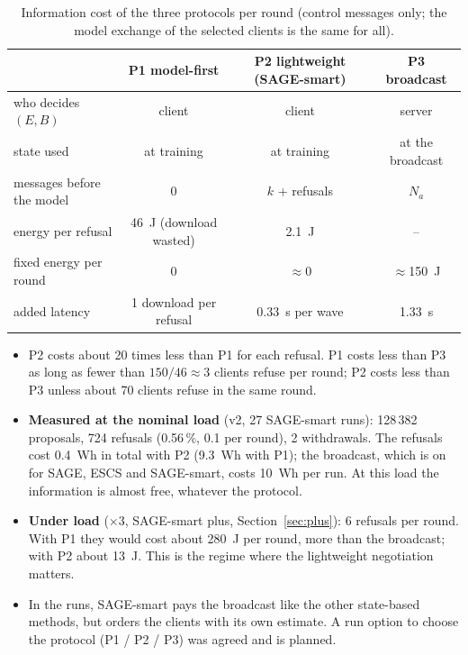 \documentclass[11pt,a4paper]{article}
\begin{document}
\begin{table}[H]
\centering
\small
\caption{Information cost of the three protocols per round (control messages
only; the model exchange of the selected clients is the same for all).}
\label{tab:protocols}
\begin{tabular}{lccc}
\toprule
& P1 model-first & P2 lightweight (SAGE-smart) & P3 broadcast \\
\midrule
who decides $(E,B)$       & client          & client              & server \\
state used                & at training     & at training         & at the broadcast \\
messages before the model & 0               & $k$ + refusals      & $N_a$ \\
energy per refusal        & 46~J (download wasted) & 2.1~J        & -- \\
fixed energy per round    & 0               & $\approx 0$         & $\approx$150~J \\
added latency             & 1 download per refusal & 0.33~s per wave & 1.33~s \\
\bottomrule
\end{tabular}
\end{table}

\begin{itemize}
  \item P2 costs about 20 times less than P1 for each refusal. P1 costs less
        than P3 as long as fewer than $150/46\approx3$ clients refuse per round;
        P2 costs less than P3 unless about 70 clients refuse in the same round.
  \item \textbf{Measured at the nominal load} (v2, 27 SAGE-smart runs): 128\,382
        proposals, 724 refusals (0.56\,\%, 0.1 per round), 2 withdrawals. The
        refusals cost 0.4~Wh in total with P2 (9.3~Wh with P1); the broadcast,
        which is on for SAGE, ESCS and SAGE-smart, costs 10~Wh per run. At this
        load the information is almost free, whatever the protocol.
  \item \textbf{Under load} ($\times3$, SAGE-smart plus,
        Section~\ref{sec:plus}): 6 refusals per round. With P1 they would cost
        about 280~J per round, more than the broadcast; with P2 about 13~J. This
        is the regime where the lightweight negotiation matters.
  \item In the runs, SAGE-smart pays the broadcast like the other state-based
        methods, but orders the clients with its own estimate. A run option to
        choose the protocol (P1 / P2 / P3) was agreed and is planned.
\end{itemize}
\end{document}

